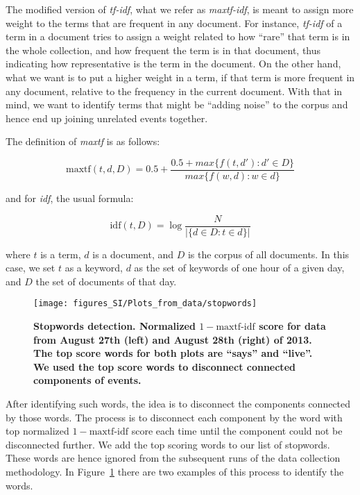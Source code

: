 The modified version of \emph{tf-idf}, what we refer as
\emph{maxtf-idf}, is meant to assign more weight to the terms that are
frequent in any document. For instance, \emph{tf-idf} of a term in a
document tries to assign a weight related to how ``rare'' that term is
in the whole collection, and how frequent the term is in that document,
thus indicating how representative is the term in the document. On the
other hand, what we want is to put a higher weight in a term, if that term is more
frequent in any document, relative to the frequency in the current
document. With that in mind, we want to identify terms that might be
``adding noise'' to the corpus and hence end up joining unrelated
events together.

The definition of \emph{maxtf} is as follows:

\begin{equation}
  \text{maxtf}(t,d,D) = 0.5 + \frac{0.5 + max\{f(t,d') : d' \in D\}}{max\{f(w,d) : w \in d\}}
\end{equation}

and for \emph{idf}, the usual formula:

\begin{equation}
  \text{idf}(t,D) = \log\frac{N}{|\{d \in D : t \in d\}|}
\end{equation}

where $t$ is a term, $d$ is a document, and $D$ is the corpus of all
documents. In this case, we set $t$ as a keyword, $d$ as the set of
keywords of one hour of a given day, and $D$ the set of documents of
that day.

\begin{figure}
  \begin{center}
    \texttt{[image: figures\_SI/Plots\_from\_data/stopwords]}
    \caption[Stopwords detection.]{\textbf{Stopwords detection.
        Normalized $1-\text{maxtf-idf}$ score for data from August
        27th (left) and August 28th (right) of 2013. The top score
        words for both plots are ``says'' and ``live''. We used the
        top score words to disconnect connected components of
        events.}}
    \label{fig:stopwords}
  \end{center}
\end{figure}


After identifying such words, the idea is to disconnect the
components connected by those words. The process is to disconnect
each component by the word with top normalized $1-\text{maxtf-idf}$
score each time until the component could not be disconnected further.
We add the top scoring words to our list of stopwords.
These words are hence ignored from the subsequent runs of the data collection methodology.
In Figure~\ref{fig:stopwords} there are two examples of this process
to identify the words.

